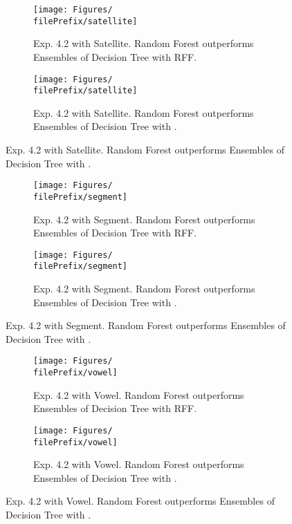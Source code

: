 \begin{figure}[H]
  \centering
  \renewcommand{\filePrefix}{\undPrefix/rff}
  \begin{subfigure}[t]{0.5\linewidth}
    \centering\captionsetup{width=.8\linewidth}\texttt{[image: Figures/\\filePrefix/satellite]}
    \caption{Exp. 4.2 with Satellite. Random Forest outperforms Ensembles of Decision Tree with RFF.}
    \label{fig:\undPrefix_satellite}
  \end{subfigure}%
  \renewcommand{\filePrefix}{\undPrefix/nys}%
  \begin{subfigure}[t]{0.5\linewidth}
    \centering\captionsetup{width=.8\linewidth}\texttt{[image: Figures/\\filePrefix/satellite]}
    \caption{Exp. 4.2 with Satellite. Random Forest outperforms Ensembles of Decision Tree with \Nys.}
    \label{fig:\undPrefix_satellite}
  \end{subfigure}
\end{figure}


\begin{figure}[H]
  \centering
  \renewcommand{\filePrefix}{\undPrefix/rff}
  \begin{subfigure}[t]{0.5\linewidth}
    \centering\captionsetup{width=.8\linewidth}\texttt{[image: Figures/\\filePrefix/segment]}
    \caption{Exp. 4.2 with Segment. Random Forest outperforms Ensembles of Decision Tree with RFF.}
    \label{fig:\undPrefix_segment}
  \end{subfigure}%
  \renewcommand{\filePrefix}{\undPrefix/nys}%
  \begin{subfigure}[t]{0.5\linewidth}
    \centering\captionsetup{width=.8\linewidth}\texttt{[image: Figures/\\filePrefix/segment]}
    \caption{Exp. 4.2 with Segment. Random Forest outperforms Ensembles of Decision Tree with \Nys.}
    \label{fig:\undPrefix_segment}
  \end{subfigure}%
\end{figure}


\begin{figure}[H]
  \centering
  \renewcommand{\filePrefix}{\undPrefix/rff}
  \begin{subfigure}[t]{0.5\linewidth}
    \centering\captionsetup{width=.8\linewidth}\texttt{[image: Figures/\\filePrefix/vowel]}
    \caption{Exp. 4.2 with Vowel. Random Forest outperforms Ensembles of Decision Tree with RFF.}
    \label{fig:\undPrefix_vowel}
  \end{subfigure}%
  \renewcommand{\filePrefix}{\undPrefix/nys}%
  \begin{subfigure}[t]{0.5\linewidth}
    \centering\captionsetup{width=.8\linewidth}\texttt{[image: Figures/\\filePrefix/vowel]}
    \caption{Exp. 4.2 with Vowel. Random Forest outperforms Ensembles of Decision Tree with \Nys.}
    \label{fig:\undPrefix_vowel}
  \end{subfigure}
\end{figure}


